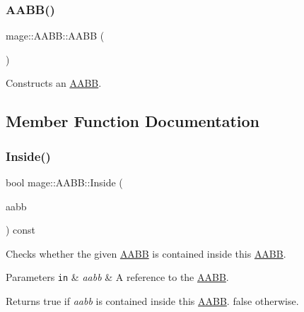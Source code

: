 \subsubsection{\texorpdfstring{A\+A\+B\+B()}{AABB()}}
{\footnotesize\ttfamily mage\+::\+A\+A\+B\+B\+::\+A\+A\+BB (\begin{DoxyParamCaption}{ }\end{DoxyParamCaption})}

Constructs an \hyperlink{structmage_1_1_a_a_b_b}{A\+A\+BB}. 

\subsection{Member Function Documentation}
\hypertarget{structmage_1_1_a_a_b_b_ad1c2ec1aab58a383219ba1082e72b020}{}\label{structmage_1_1_a_a_b_b_ad1c2ec1aab58a383219ba1082e72b020} 
\subsubsection{\texorpdfstring{Inside()}{Inside()}\hspace{0.1cm}{\footnotesize\ttfamily [1/2]}}
{\footnotesize\ttfamily bool mage\+::\+A\+A\+B\+B\+::\+Inside (\begin{DoxyParamCaption}\item[{\hyperlink{structmage_1_1_a_a_b_b}{A\+A\+BB} \&}]{aabb }\end{DoxyParamCaption}) const}

Checks whether the given \hyperlink{structmage_1_1_a_a_b_b}{A\+A\+BB} is contained inside this \hyperlink{structmage_1_1_a_a_b_b}{A\+A\+BB}.


\begin{DoxyParams}[1]{Parameters}
\mbox{\tt in}  & {\em aabb} & A reference to the \hyperlink{structmage_1_1_a_a_b_b}{A\+A\+BB}. \\
\hline
\end{DoxyParams}
\begin{DoxyReturn}{Returns}
{\ttfamily true} if {\itshape aabb} is contained inside this \hyperlink{structmage_1_1_a_a_b_b}{A\+A\+BB}. {\ttfamily false} otherwise. 
\end{DoxyReturn}
\hypertarget{structmage_1_1_a_a_b_b_ad8b5d30287d5dcb98ad2dfcfb90c5e22}{}\label{structmage_1_1_a_a_b_b_ad8b5d30287d5dcb98ad2dfcfb90c5e22} 
